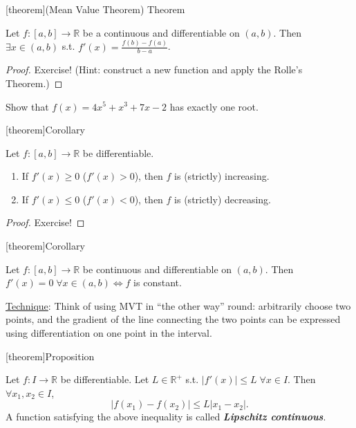 \documentclass[12pt]{report}
\theoremstyle{definition}
\begin{document}
[theorem]{(Mean Value Theorem) Theorem}
\begin{mean value theorem}
    Let $f:[a,b]\rightarrow{}\mathbb{R}$ be a continuous and differentiable on $(a,b)$.
    Then $\exists x \in (a,b)$ s.t. $f'(x) = \frac{f(b)-f(a)}{b-a}$.
\end{mean value theorem}

\begin{proof}
    Exercise! (Hint: construct a new function and apply the Rolle's Theorem.)
\end{proof}

\begin{ex}
    Show that $f(x) = 4x^{5} + x^{3} + 7x - 2$ has exactly one root.
\end{ex}

[theorem]{Corollary}
\begin{strictly increasing or decreasing definition}
    Let $f:[a,b]\rightarrow{}\mathbb{R}$ be differentiable.
    \begin{enumerate}
        \item If $f'(x)\ge 0$ ($f'(x)>0$), then $f$ is (strictly) increasing.
        \item If $f'(x)\le 0$ ($f'(x)<0$), then $f$ is (strictly) decreasing.
    \end{enumerate}
\end{strictly increasing or decreasing definition}

\begin{proof}
    Exercise!
\end{proof}

[theorem]{Corollary}
\begin{f is constant then gradient is 0}
    Let $f:[a,b]\rightarrow{}\mathbb{R}$ be continuous and differentiable on $(a,b)$.
    Then $f'(x) = 0 \;\forall x \in (a,b) \iff f$ is constant.
\end{f is constant then gradient is 0}

\underline{Technique}: Think of using MVT in ``the other way'' round: 
arbitrarily choose two points,
and the gradient of the line connecting the two points can be expressed using
differentiation on one point in the interval.

[theorem]{Proposition}
\begin{Lipschitz continuous}
    Let $f:I\rightarrow{}\mathbb{R}$ be differentiable.
    Let $L\in \mathbb{R}^{+}$ s.t. $|f'(x)|\le L \;\forall x \in I$.
    Then $\forall x_1, x_2\in I$,\[
        |f(x_1) - f(x_2)| \le L|x_1 - x_2|.
    \]
    A function satisfying the above inequality is called \textbf{\emph{Lipschitz continuous}}.
\end{Lipschitz continuous}








\end{document}
